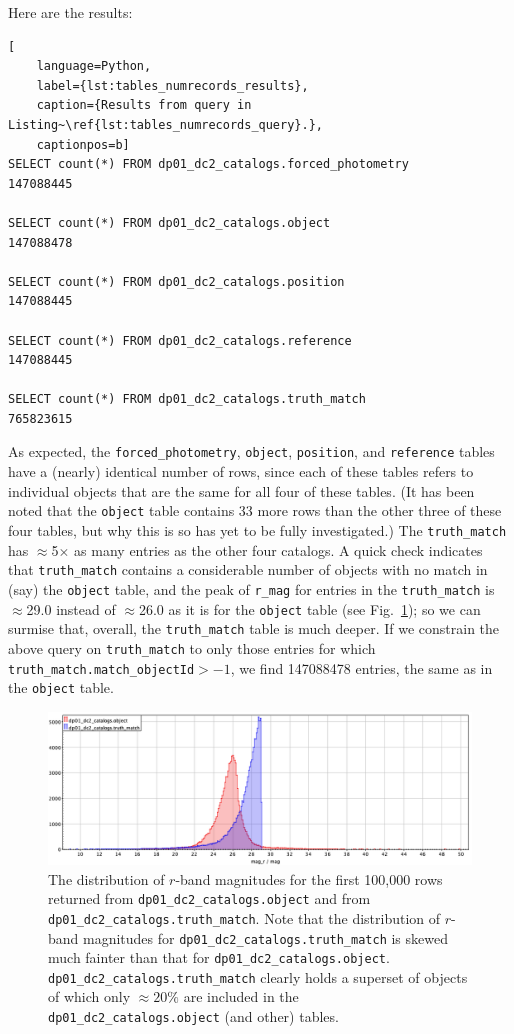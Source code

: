 \documentclass[DM,authoryear,toc]{lsstdoc}
\begin{document}
Here are the results:

\begin{lstlisting}[
    language=Python,
    label={lst:tables_numrecords_results},
    caption={Results from query in Listing~\ref{lst:tables_numrecords_query}.},
    captionpos=b]
SELECT count(*) FROM dp01_dc2_catalogs.forced_photometry
147088445

SELECT count(*) FROM dp01_dc2_catalogs.object
147088478

SELECT count(*) FROM dp01_dc2_catalogs.position
147088445
 
SELECT count(*) FROM dp01_dc2_catalogs.reference
147088445

SELECT count(*) FROM dp01_dc2_catalogs.truth_match
765823615
\end{lstlisting}

As expected, the \texttt{forced\_photometry}, \texttt{object},
\texttt{position}, and \texttt{reference} tables have a (nearly)
identical number of rows, since each of these tables refers to
individual objects that are the same for all four of these tables.
(It has been noted that the \texttt{object} table contains 33 more
rows than the other three of these four tables, but why this is so has
yet to be fully investigated.)  The \texttt{truth\_match} has
$\approx$5$\times$ as many entries as the other four catalogs.  A
quick check indicates that \texttt{truth\_match} contains a
considerable number of objects with no match in (say) the
\texttt{object} table, and the peak of \texttt{r\_mag} for entries in
the \texttt{truth\_match} is $\approx$29.0 instead of $\approx$26.0 as it is
for the \texttt{object} table (see
Fig.~\ref{fig:truth_match_object_mag_r}); so we can surmise that, overall,
the \texttt{truth\_match} table is much deeper.  If we constrain the above
query on \texttt{truth\_match} to only those entries for which
\texttt{truth\_match.match\_objectId}$>-1$, we find 147088478 entries,
the same as in the \texttt{object} table.

\begin{figure}
\includegraphics[width=1.0\textwidth]{Plots/truth_match_object_mag_r.png}
\caption{The distribution of $r$-band magnitudes for the first 100,000 rows returned from \texttt{dp01\_dc2\_catalogs.object} and from \texttt{dp01\_dc2\_catalogs.truth\_match}.  Note that the distribution of $r$-band magnitudes for \texttt{dp01\_dc2\_catalogs.truth\_match} is skewed much fainter than that for \texttt{dp01\_dc2\_catalogs.object}.  \texttt{dp01\_dc2\_catalogs.truth\_match}  clearly holds a superset of objects of which only $\approx20\%$ are included in the \texttt{dp01\_dc2\_catalogs.object} (and other) tables.
 }
\label{fig:truth_match_object_mag_r}
\end{figure}
\end{document}
